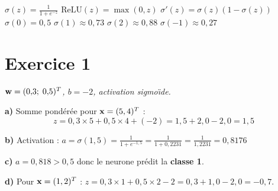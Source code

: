 %






\setlength{\parskip}{2pt}
\setlength{\abovedisplayskip}{5pt}
\setlength{\belowdisplayskip}{5pt}

\begin{tcolorbox}[
    enhanced, colback=ipssiCyan!5, colframe=ipssiCyan!50,
    boxrule=0.8pt, arc=4pt,
    title={\sffamily\bfseries Rappels},
    coltitle=white, colbacktitle=ipssiCyan!70,
]
\small
$\sigma(z) = \frac{1}{1+e^{-z}}$ \;\;
$\text{ReLU}(z) = \max(0,z)$ \;\;
$\sigma'(z) = \sigma(z)(1-\sigma(z))$ \;\;
$\sigma(0) = 0{,}5$ \;\;
$\sigma(1) \approx 0{,}73$ \;\;
$\sigma(2) \approx 0{,}88$ \;\;
$\sigma(-1) \approx 0{,}27$
\end{tcolorbox}

\section*{Exercice 1 \hfill \exofondamental}
\textit{$\mathbf{w} = (0{,}3;\; 0{,}5)^T$, $b = -2$, activation sigmo\"{\i}de.}

\separateur

\textbf{a)} Somme pond\'{e}r\'{e}e pour $\mathbf{x} = (5, 4)^T$ :
\[
    z = 0{,}3 \times 5 + 0{,}5 \times 4 + (-2) = 1{,}5 + 2{,}0 - 2{,}0 = \boxed{1{,}5}
\]

\textbf{b)} Activation :
$a = \sigma(1{,}5) = \frac{1}{1 + e^{-1{,}5}} = \frac{1}{1 + 0{,}2231} = \frac{1}{1{,}2231} = \boxed{0{,}8176}$

\textbf{c)} $a = 0{,}818 > 0{,}5$ donc le neurone pr\'{e}dit la \textbf{classe 1}.

\textbf{d)} Pour $\mathbf{x} = (1, 2)^T$ :
$z = 0{,}3 \times 1 + 0{,}5 \times 2 - 2 = 0{,}3 + 1{,}0 - 2{,}0 = -0{,}7$.

